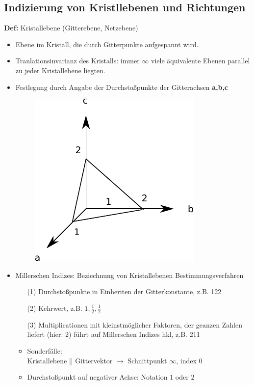 \subsection{Indizierung von Kristllebenen und Richtungen}
\label{kap:2_4}
\textbf{Def:} Kristallebene (Gitterebene, Netzebene)
\begin{itemize}
    \item Ebene im Kristall, die durch Gitterpunkte aufgespannt wird.
    \item Tranlationsinvarianz des Kristalls: immer $\infty$ viele äquivalente Ebenen parallel zu jeder Kristallebene liegten.
    \item Festlegung durch Angabe der Durchstoßpunkte der Gitterachsen \textbf{a,b,c}
    \begin{figure}[H]
        \centering
        \includegraphics{figures/2_4dreieck.pdf}
        \caption{}
        \label{}
    \end{figure}
    \item Millerschen Indizes: Beziechnung von Kristallebenen Bestimmungsverfahren
    \begin{itemize}
        \item[(1)] Durchstoßpunkte in Einheriten der Gitterkonstante, z.B. 122
        \item[(2)] Kehrwert, z.B. $1, \frac{1}{2}, \frac{1}{2}$
        \item[(3)]  Multiplicationen mit kleinstmöglicher Faktoren, der geanzen Zahlen liefert (hier: 2) führt auf Millerschen Indizes hkl, z.B. 211
    \end{itemize}
    \begin{itemize}
        \item Sonderfälle:\\
        Kristallebene || Gittervektor $\rightarrow$ Schnittpunkt $\infty$, index 0
        \item Durchstoßpunkt auf negativer Achse: Notation $1$ oder $2$
    \end{itemize}

\end{itemize}
